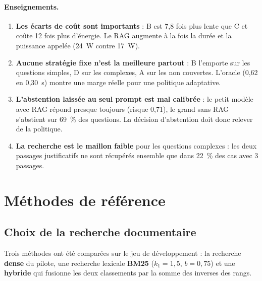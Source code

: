 \documentclass[11pt,a4paper]{article}
\begin{document}
\paragraph{Enseignements.}
\begin{enumerate}
\item \textbf{Les écarts de coût sont importants} : B est 7,8 fois plus lente que C et coûte 12 fois
plus d'énergie. Le RAG augmente à la fois la durée et la puissance appelée (24~W contre 17~W).
\item \textbf{Aucune stratégie fixe n'est la meilleure partout} : B l'emporte sur les questions simples,
D sur les complexes, A sur les non couvertes. L'oracle (0,62 en 0,30~s) montre une marge réelle pour
une politique adaptative.
\item \textbf{L'abstention laissée au seul prompt est mal calibrée} : le petit modèle avec RAG répond
presque toujours (risque 0,71), le grand sans RAG s'abstient sur 69~\% des questions. La décision
d'abstention doit donc relever de la politique.
\item \textbf{La recherche est le maillon faible} pour les questions complexes : les deux passages
justificatifs ne sont récupérés ensemble que dans 22~\% des cas avec 3 passages.
\end{enumerate}

\section{Méthodes de référence}\label{sec:references}

\subsection{Choix de la recherche documentaire}

Trois méthodes ont été comparées sur le jeu de développement : la recherche \textbf{dense} du pilote,
une recherche lexicale \textbf{BM25} ($k_1 = 1{,}5$, $b = 0{,}75$) et une \textbf{hybride} qui fusionne
les deux classements par la somme des inverses des rangs.
\end{document}
